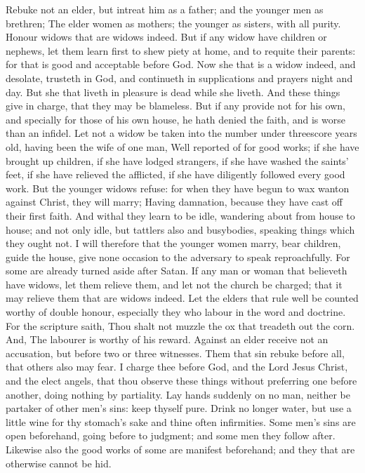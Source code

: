  Rebuke not an elder, but intreat him as a father; and the
younger men as brethren;  The elder women as mothers; the
younger as sisters, with all purity.  Honour widows that are
widows indeed.  But if any widow have children or nephews,
let them learn first to shew piety at home, and to requite their
parents: for that is good and acceptable before God.  Now
she that is a widow indeed, and desolate, trusteth in God, and
continueth in supplications and prayers night and day.  But
she that liveth in pleasure is dead while she liveth.  And
these things give in charge, that they may be blameless. 
But if any provide not for his own, and specially for those of his own
house, he hath denied the faith, and is worse than an infidel.
 Let not a widow be taken into the number under threescore
years old, having been the wife of one man,  Well reported
of for good works; if she have brought up children, if she have lodged
strangers, if she have washed the saints' feet, if she have relieved the
afflicted, if she have diligently followed every good work.
 But the younger widows refuse: for when they have begun to
wax wanton against Christ, they will marry;  Having
damnation, because they have cast off their first faith. 
And withal they learn to be idle, wandering about from house to house;
and not only idle, but tattlers also and busybodies, speaking things
which they ought not.  I will therefore that the younger
women marry, bear children, guide the house, give none occasion to the
adversary to speak reproachfully.  For some are already
turned aside after Satan.  If any man or woman that
believeth have widows, let them relieve them, and let not the church be
charged; that it may relieve them that are widows indeed. 
Let the elders that rule well be counted worthy of double honour,
especially they who labour in the word and doctrine.  For
the scripture saith, Thou shalt not muzzle the ox that treadeth out the
corn. And, The labourer is worthy of his reward.  Against
an elder receive not an accusation, but before two or three witnesses.
 Them that sin rebuke before all, that others also may
fear.  I charge thee before God, and the Lord Jesus Christ,
and the elect angels, that thou observe these things without preferring
one before another, doing nothing by partiality.  Lay hands
suddenly on no man, neither be partaker of other men's sins: keep
thyself pure.  Drink no longer water, but use a little wine
for thy stomach's sake and thine often infirmities.  Some
men's sins are open beforehand, going before to judgment; and some men
they follow after.  Likewise also the good works of some
are manifest beforehand; and they that are otherwise cannot be hid.

